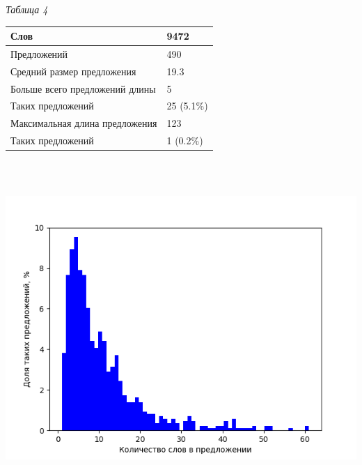 \documentclass{kursa4}
\begin{document}
    \bigskip


    \bigskip


    \bigskip


    \bigskip


    \bigskip


    \bigskip

    {\centering
    \textit{{Таблица 4}}
    \par}

    \begin{center}
    \tablehead{}
    \begin{supertabular}{|m{5.7730002cm}|m{1.6559999cm}|}
    \hline
    Слов &
    9472\\\hline
    Предложений &
    490\\\hline
    Средний размер предложения &
    19.3\\\hline
    Больше всего предложений длины &
    5\\\hline
    Таких предложений &
    25 (5.1\%)\\\hline
    Максимальная длина предложения &
    123\\\hline
    Таких предложений &
    1 (0.2\%)\\\hline
    \end{supertabular}
    \end{center}
     \includegraphics[width=16.933cm,height=12.7cm]{irmw2lnohyper-img4.png} 
\end{document}
